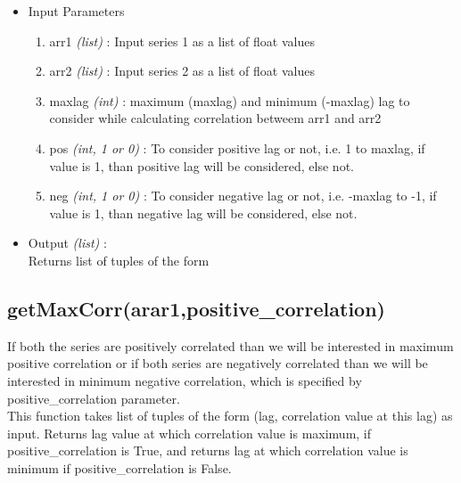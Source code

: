 \begin{itemize}
 \item Input Parameters
 
 \begin{enumerate}
  \item arr1 \textit{(list)} : Input series 1 as a list of float values
  \item arr2 \textit{(list)} : Input series 2 as a list of float values
  \item maxlag \textit{(int)} : maximum (maxlag) and minimum (-maxlag) lag to 
consider while calculating correlation betweem arr1 and arr2
  \item pos \textit{(int, 1 or 0)} : To consider positive lag or not, i.e. 1 to 
maxlag, if value is 1, than positive lag will be considered, else not.
  \item neg \textit{(int, 1 or 0)} : To consider negative lag or not, i.e. 
-maxlag to -1, if value is 1, than negative lag will be considered, else not.
 \end{enumerate}

 \item Output \textit{(list)} : \\
  Returns list of tuples of the form \\
 
\end{itemize}

\subsection{getMaxCorr(arar1,positive\_correlation)}

If both the series are positively correlated than we will be 
interested in maximum positive correlation or if both series are negatively 
correlated than we will be interested in minimum negative correlation, which is 
specified by positive\_correlation parameter.
\\
This function takes list of tuples of the form (lag, correlation value at this 
lag) as  input. Returns lag value at which correlation value is maximum, if 
positive\_correlation is True, and returns lag at which correlation value is 
minimum if positive\_correlation is False. \\



